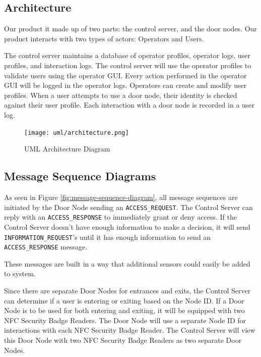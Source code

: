 \subsection{Architecture}

Our product it made up of two parts: the control server, and the door nodes.
Our product interacts with two types of actors: Operators and Users.

The control server maintains a database of operator profiles, operator logs,
user profiles, and interaction logs.  The control server will use the operator
profiles to validate users using the operator GUI.  Every action performed in
the operator GUI will be logged in the operator logs.  Operators can create and
modify user profiles.  When a user attempts to use a door node, their identity
is checked against their user profile.  Each interaction with a door node is
recorded in a user log.

\begin{figure}[!htb]
\centering
\texttt{[image: uml/architecture.png]}
\caption{UML Architecture Diagram}
\label{fig:architecture-diagram}
\end{figure}

\subsection{Message Sequence Diagrams}

As seen in Figure \ref{fig:message-sequence-diagram}, all message sequences are
initiated by the Door Node sending an \verb|ACCESS_REQUEST|.  The Control Server can
reply with an \verb|ACCESS_RESPONSE| to immediately grant or deny access.  If the
Control Server doesn't have enough information to make a decision, it will send
\verb|INFORMATION_REQUEST|'s until it has enough information to send an
\verb|ACCESS_RESPONSE| message.

These messages are built in a way that additional sensors could easily be added
to system.

Since there are separate Door Nodes for entrances and exits, the Control Server
can determine if a user is entering or exiting based on the Node ID.  If a Door
Node is to be used for both entering and exiting, it will be equipped with two
NFC Security Badge Readers.  The Door Node will use a separate Node ID for
interactions with each NFC Security Badge Reader.  The Control Server will view
this Door Node with two NFC Security Badge Readers as two separate Door Nodes.

